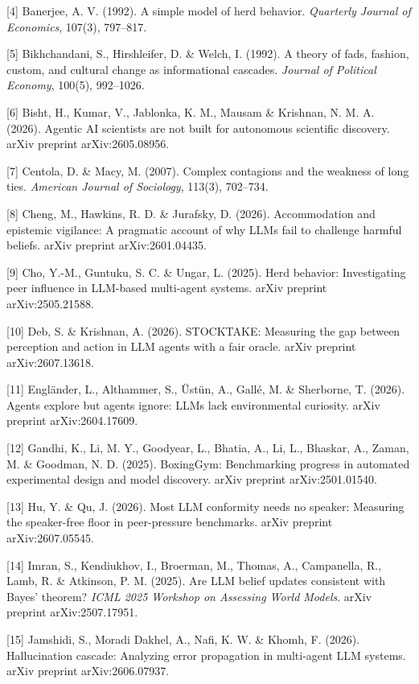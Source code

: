 \documentclass[pdflatex,sn-basic]{sn-jnl}
\begin{document}
{[}4{]} Banerjee, A. V. (1992). A simple model of herd behavior. \emph{Quarterly Journal of Economics}, 107(3), 797--817.

{[}5{]} Bikhchandani, S., Hirshleifer, D. \& Welch, I. (1992). A theory of fads, fashion, custom, and cultural change as informational cascades. \emph{Journal of Political Economy}, 100(5), 992--1026.

{[}6{]} Bisht, H., Kumar, V., Jablonka, K. M., Mausam \& Krishnan, N. M. A. (2026). Agentic AI scientists are not built for autonomous scientific discovery. arXiv preprint arXiv:2605.08956.

{[}7{]} Centola, D. \& Macy, M. (2007). Complex contagions and the weakness of long ties. \emph{American Journal of Sociology}, 113(3), 702--734.

{[}8{]} Cheng, M., Hawkins, R. D. \& Jurafsky, D. (2026). Accommodation and epistemic vigilance: A pragmatic account of why LLMs fail to challenge harmful beliefs. arXiv preprint arXiv:2601.04435.

{[}9{]} Cho, Y.-M., Guntuku, S. C. \& Ungar, L. (2025). Herd behavior: Investigating peer influence in LLM-based multi-agent systems. arXiv preprint arXiv:2505.21588.

{[}10{]} Deb, S. \& Krishnan, A. (2026). STOCKTAKE: Measuring the gap between perception and action in LLM agents with a fair oracle. arXiv preprint arXiv:2607.13618.

{[}11{]} Engländer, L., Althammer, S., Üstün, A., Gallé, M. \& Sherborne, T. (2026). Agents explore but agents ignore: LLMs lack environmental curiosity. arXiv preprint arXiv:2604.17609.

{[}12{]} Gandhi, K., Li, M. Y., Goodyear, L., Bhatia, A., Li, L., Bhaskar, A., Zaman, M. \& Goodman, N. D. (2025). BoxingGym: Benchmarking progress in automated experimental design and model discovery. arXiv preprint arXiv:2501.01540.

{[}13{]} Hu, Y. \& Qu, J. (2026). Most LLM conformity needs no speaker: Measuring the speaker-free floor in peer-pressure benchmarks. arXiv preprint arXiv:2607.05545.

{[}14{]} Imran, S., Kendiukhov, I., Broerman, M., Thomas, A., Campanella, R., Lamb, R. \& Atkinson, P. M. (2025). Are LLM belief updates consistent with Bayes' theorem? \emph{ICML 2025 Workshop on Assessing World Models}. arXiv preprint arXiv:2507.17951.

{[}15{]} Jamshidi, S., Moradi Dakhel, A., Nafi, K. W. \& Khomh, F. (2026). Hallucination cascade: Analyzing error propagation in multi-agent LLM systems. arXiv preprint arXiv:2606.07937.
\end{document}
